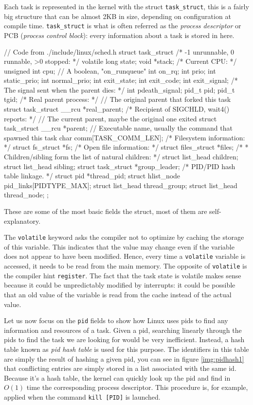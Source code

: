 Each task is represented in the kernel with the struct \verb|task_struct|, this is a fairly big structure that can be almost 2KB in size, depending on configuration at compile time. \verb|task_struct| is what is often referred as the \textit{process descriptor} or PCB (\textit{process control block}): every information about a task is stored in here. 
\begin{code}
// Code from ./include/linux/sched.h
struct task_struct {
	/* -1 unrunnable, 0 runnable, >0 stopped: */
	volatile long			state;
	void				*stack;
	/* Current CPU: */
	unsigned int			cpu;
	// A boolean, "on_runqueue"
	int				on_rq; 
	int				prio;
	int				static_prio;
	int				normal_prio;
        int				exit_state;
	int				exit_code;
	int				exit_signal;
	/* The signal sent when the parent dies: */
	int				pdeath_signal;
	pid_t				pid;
	pid_t				tgid;
        /* Real parent process: */
        // The original parent that forked this task
	struct task_struct __rcu	*real_parent;
	/* Recipient of SIGCHLD, wait4() reports: */
	// The current parent, maybe the original one exited
	struct task_struct __rcu	*parent;
	// Executable name, usually the command that spawned this task
	char				comm[TASK_COMM_LEN]; 
        /* Filesystem information: */
	struct fs_struct		   *fs;
	/* Open file information: */
	struct files_struct		*files;
	/*
	 * Children/sibling form the list of natural children:
	 */
	struct list_head		children;
	struct list_head		sibling;
	struct task_struct	   *group_leader;
	/* PID/PID hash table linkage. */
	struct pid			*thread_pid;
	struct hlist_node	   pid_links[PIDTYPE_MAX];
	struct list_head		thread_group;
	struct list_head		thread_node;
};
\end{code}
These are some of the most basic fields the struct, most of them are self-explanatory.

The \verb|volatile| keyword asks the compiler not to optimize by
caching the storage of this variable. This indicates that the value
may change even if the variable does not appear to have been
modified. Hence, every time a \texttt{volatile} variable is accessed,
it needs to be read from the main memory. The opposite of
\verb|volatile| is the compiler hint \verb|register|. The fact that
the task state is volatile makes sense because it could be
unpredictably modified by interrupts: it could be possible that an old
value of the variable is read from the cache instead of the actual
value.

Let us now focus on the \texttt{pid} fields to show how Linux uses
pids to find any information and resources of a task. Given a pid,
searching linearly through the pids to find the task we are looking
for would be very inefficient. Instead, a hash table known as
\textit{pid hash table} is used for this purpose. The identifiers in this table are simply the result of hashing a given pid, you can see
in figure \ref{img:pidhash1} that conflicting entries are simply
stored in a list associated with the same id. Because it's a hash
table, the kernel can quickly look up the pid and find in $O(1)$ time
the corresponding process descriptor. This procedure is, for example,
applied when the command \verb|kill [PID]| is launched.

